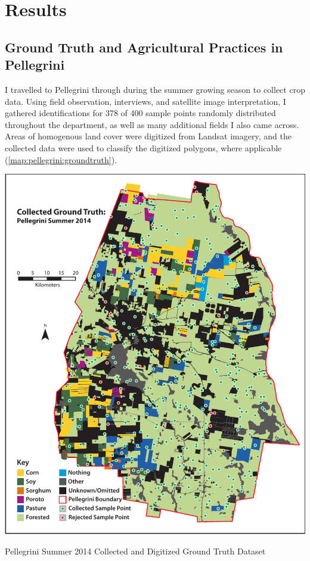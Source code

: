 \chapter{Results}
\label{results}

\section{Ground Truth and Agricultural Practices in Pellegrini}

I travelled to Pellegrini  through  during the summer growing season to collect crop data. Using field observation, interviews, and satellite image interpretation, I gathered identifications for 378 of 400 sample points randomly distributed throughout the department, as well as many additional fields I also came across. Areas of homogenous land cover were digitized from Landsat imagery, and the collected data were used to classify the digitized polygons, where applicable (\autoref{map:pellegrini:groundtruth}).

\begin{ssfigure}
  \centering
  \includegraphics[width=\textwidth]{Graphics/collecteddata_bgpts.pdf}
  \caption{Pellegrini Summer 2014 Collected and Digitized Ground Truth Dataset}
  \label{map:pellegrini:groundtruth}
\end{ssfigure}

